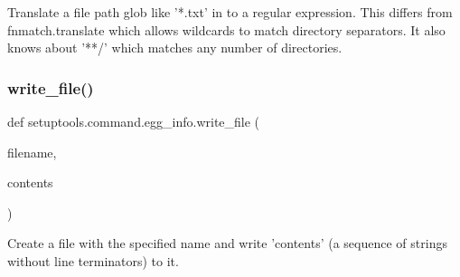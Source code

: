 \begin{DoxyVerb}Translate a file path glob like '*.txt' in to a regular expression.
This differs from fnmatch.translate which allows wildcards to match
directory separators. It also knows about '**/' which matches any number of
directories.
\end{DoxyVerb}
 \mbox{\label{namespacesetuptools_1_1command_1_1egg__info_a3f7abc3fba29e56b617aa9b520a4ec92}} 
\subsubsection{\texorpdfstring{write\+\_\+file()}{write\_file()}}
{\footnotesize\ttfamily def setuptools.\+command.\+egg\+\_\+info.\+write\+\_\+file (\begin{DoxyParamCaption}\item[{}]{filename,  }\item[{}]{contents }\end{DoxyParamCaption})}

\begin{DoxyVerb}Create a file with the specified name and write 'contents' (a
sequence of strings without line terminators) to it.
\end{DoxyVerb}
 